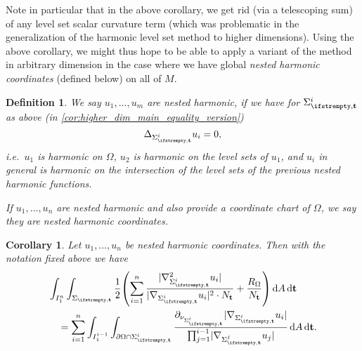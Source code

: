 \documentclass[draft]{amsart}
\newtheorem{corollary}[theorem]{Corollary}
\newtheorem{definition}[theorem]{Definition}
\newcommand*{\mathcomma}{,}
\newcommand*{\mathfullstop}{.}
\DeclarePairedDelimiter{\parens}{(}{)}
\let\p\parens %
\newcommand*{\laplacian}{\Delta}
\newcommand*{\boundary}{\partial}
\DeclarePairedDelimiter{\abs}{\lvert}{\rvert} %
\begin{document}
Note in particular that in the above corollary, we get rid (via a telescoping sum) of any level set scalar curvature term (which was problematic in the generalization of the harmonic level set method to higher dimensions). Using the above corollary, we might thus hope to be able to apply a variant of the method in arbitrary dimension in the case where we have global \emph{nested harmonic coordinates} (defined below) on all of \( M \). 

\begin{definition}
    We say \( u_1,\dotsc,u_m \) are \emph{nested harmonic}, if we have for \( \nls^i \) as above (in \cref{cor:higher_dim_main_equality_version})
    \begin{equation*}
        \laplacian_{\nls^i}u_i=0\mathcomma
    \end{equation*}
    i.e.~\( u_1 \) is harmonic on \( \Omega \), \( u_2 \) is harmonic on the level sets of \( u_1 \), and \( u_i \) in general is harmonic on the intersection of the level sets of the previous nested harmonic functions.

    If \( u_1,\dotsc,u_n \) are nested harmonic and also provide a coordinate chart of \( \Omega \), we say they are \emph{nested harmonic coordinates}.
\end{definition}
\begin{corollary}\label{cor:harmonic_higher_dim_main_equality_version}
    Let \( u_1,\dotsc,u_n \) be nested harmonic coordinates. Then with the notation fixed above we have
    \begin{align*}
        &\int_{I_1^n}\int_{\nls}\frac{1}{2}\p*{\sum_{i=1}^{n}\frac{\abs{\nabla_{\nls^i}^2 u_i}}{\abs{\nabla_{\nls^i}u_i}^2\cdot N_{\vect{t}}}+\frac{R_\Omega}{N_{\vect{t}}}}\odif{A}\odif{\vect{t}}\\
        &\quad=\sum_{i=1}^{n}\int_{I_1^{i-1}}\int_{\boundary{\Omega}\cap \nls^i}\frac{\partial_{\nu_{\nls^i}}\abs{\nabla_{\nls^i}u_i}}{\prod_{j=1}^{i-1}\abs{\nabla_{\nls^j}u_j}}\odif{A}\odif{\vect{t}}\mathfullstop
    \end{align*}
\end{corollary}
\end{document}
